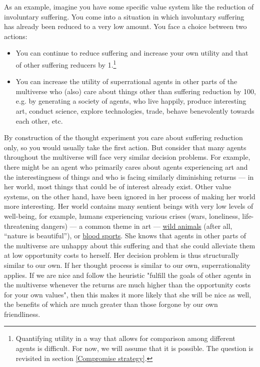 \documentclass{book}
\begin{document}
As an example, imagine you have some specific value system like the reduction of involuntary suffering. You come into a situation in which involuntary suffering has already been reduced to a very low amount. You face a choice between two actions:
\begin{itemize}
\item You can continue to reduce suffering and increase your own utility and that of other suffering reducers by 1.\footnote{Quantifying utility in a way that allows for comparison among different agents is difficult. For now, we will assume that it is possible. The question is revisited in section \ref{Compromise strategy}.}
\item You can increase the utility of superrational agents in other parts of the multiverse who (also) care about things other than suffering reduction by 100, e.g. by generating a society of agents, who live happily, produce interesting art, conduct science, explore technologies, trade, behave benevolently towards each other, etc.
\end{itemize}
By construction of the thought experiment you care about suffering reduction only, so you would usually take the first action. But consider that many agents throughout the multiverse will face very similar decision problems. For example, there might be an agent who primarily cares about agents experiencing art and the interestingness of things and who is facing similarly diminishing returns --- in her world, most things that could be of interest already exist. Other value systems, on the other hand, have been ignored in her process of making her world more interesting. Her world contains many sentient beings with very low levels of well-being, for example, humans experiencing various crises (wars, loneliness, life-threatening dangers) --- a common theme in art --- \href{https://foundational-research.org/the-importance-of-wild-animal-suffering/}{wild animals} (after all, “nature is beautiful”), or \href{https://en.wikipedia.org/wiki/Blood_sport}{blood sports}. She knows that agents in other parts of the multiverse are unhappy about this suffering and that she could alleviate them at low opportunity costs to herself. Her decision problem is thus structurally similar to our own. If her thought process is similar to our own, superrationality applies. If we are nice and follow the heuristic "fulfill the goals of other agents in the multiverse whenever the returns are much higher than the opportunity costs for your own values", then this makes it more likely that she will be nice as well, the benefits of which are much greater than those forgone by our own friendliness.
 
\end{document}
